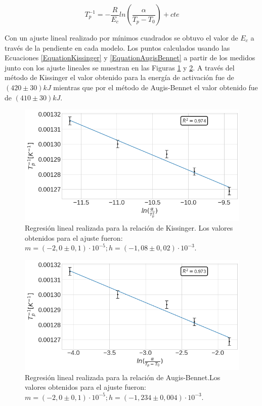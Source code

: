 \documentclass[12pt]{article}
\theoremstyle{definition}
\theoremstyle{remark}
\begin{document}
{\begin{equation}
\label{EquationAugisBennet}
	T_p^{-1}=-\frac{R}{E_c}ln(\frac{\alpha}{T_p-T_0})+cte
\end{equation}

Con un ajuste lineal realizado por mínimos cuadrados se obtuvo el valor de $E_c$ a través de la pendiente en cada modelo. Los puntos calculados usando las Ecuaciones \ref{EquationKissinger} y \ref{EquationAugisBennet} a partir de los medidos junto con los ajuste lineales se muestran en las Figuras \ref{Kiss} y \ref{AugBen}. A través del método de Kissinger el valor obtenido para la energía de activación fue de $(420 \pm 30) kJ$ mientras que por el método de Augis-Bennet el valor obtenido fue de $(410 \pm 30) kJ$.

\begin{figure}[H]
 	\centering
	\includegraphics[scale=0.6]{img/Kissinger.png}
 	\caption{Regresión lineal realizada para la relación de Kissinger. Los valores obtenidos para el ajuste fueron: $m=(-2,0\pm0,1)\cdot10^{-5}; h=(-1,08\pm0,02)\cdot10^{-3}$.}
	\label{Kiss}
\end{figure} 

 \begin{figure}[H]
 	\centering
	\includegraphics[scale=0.6]{img/Augis_bennet.png}
 	\caption{Regresión lineal realizada para la relación de Augis-Bennet.Los valores obtenidos para el ajuste fueron: $m=(-2,0\pm0,1)\cdot10^{-5}; h=(-1,234\pm0,004)\cdot10^{-3}$.}
	\label{AugBen}
\end{figure} 

}
\end{document}
